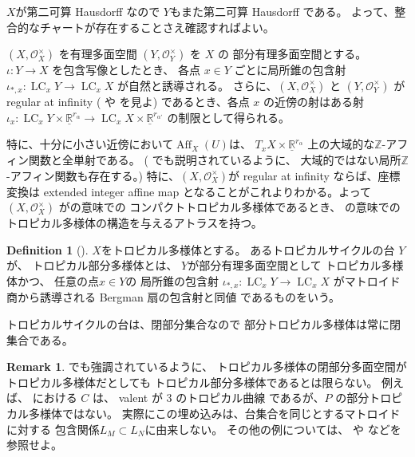 \documentclass[a4paper,dvipdfmx,reqno,12pt]{amsart}
\theoremstyle{definition}
\newtheorem{definition}[theorem]{Definition}
\newtheorem{remark}[theorem]{Remark}
\newcommand{\opn}[1]{\operatorname{#1}}
\numberwithin{equation}{section}
\begin{document}
$X$が第二可算 Hausdorff なので
$Y$もまた第二可算 Hausdorff である。
よって、整合的なチャートが存在することさえ確認すればよい。

$(X,\mathcal{O}_X^{\times})$ を有理多面空間
$(Y,\mathcal{O}_Y^{\times})$ を $X$ の
部分有理多面空間とする。
$\iota\colon Y \to X$ を包含写像としたとき、
各点 $x\in Y$ ごとに局所錐の包含射
$\iota_{*,x}\colon \opn{LC}_x Y\to \opn{LC}_x X$
が自然と誘導される。
さらに、$(X,\mathcal{O}_X^{\times})$ と
$(Y,\mathcal{O}_Y^{\times})$ が
regular at infinity 
(\cite[]{MR4637248} や
\cite[Definition 1.2]{MR3330789} を見よ) 
であるとき、各点 $x$ の近傍の射はある射
$\iota_{x}\colon \opn{LC}_x Y\times 
\underline{\mathbb{R}}^{r_{\alpha}}
\to \opn{LC}_x X\times \underline{\mathbb{R}}^{r_{\alpha'}}$
の制限として得られる。

特に、十分に小さい近傍において$\opn{Aff}_X(U)$は、
$T_x X\times \underline{\mathbb{R}}^{r_{\alpha}}$
上の大域的な$\mathbb{Z}$-アフィン関数と全単射である。
(\cite[Example 2.1]{MR4637248} でも説明されているように、
大域的ではない局所$\mathbb{Z}$-アフィン関数も存在する。)
特に、$(X,\mathcal{O}_X^{\times})$が regular at infinity
ならば、座標変換は
extended integer affine map \cite[Definition 2.2]{demedrano2023chern}
となることがこれよりわかる。よって
$(X,\mathcal{O}_X^{\times})$ 
が\cite[Definition 6.1]{gross2019sheaftheoretic}の意味での
コンパクトトロピカル多様体であるとき、
\cite[Definition 2.3]{demedrano2023chern}
の意味でのトロピカル多様体の構造を与えるアトラスを持つ。


\begin{definition}[{\cite[Definition 2.14]{demedrano2023chern}}]
$X$をトロピカル多様体とする。
あるトロピカルサイクルの台 $Y$ が、
トロピカル部分多様体とは、
$Y$が部分有理多面空間として
トロピカル多様体かつ、
任意の点$x\in Y$の
局所錐の包含射
$\iota_{*,x}\colon \opn{LC}_x Y\to 
\opn{LC}_x X$
がマトロイド商から誘導される
Bergman 扇の包含射と同値
であるものをいう。
\end{definition}


トロピカルサイクルの台は、閉部分集合なので
部分トロピカル多様体は常に閉集合である。

\begin{remark}
\cite[Example 2.15]{demedrano2023chern}でも強調されているように、
トロピカル多様体の閉部分多面空間がトロピカル多様体だとしても
トロピカル部分多様体であるとは限らない。
例えば、
\cite[Example 2.21]{shaw2015tropical}
における $C$ は、 valent が $3$ のトロピカル曲線
であるが、$P$ の部分トロピカル多様体ではない。
実際にこの埋め込みは、台集合を同じとするマトロイドに対する
包含関係$L_M\subset L_N$に由来しない。
その他の例については、
\cite{MR2594592} や \cite{MR3339531}
などを参照せよ。


\end{remark}
\end{document}
